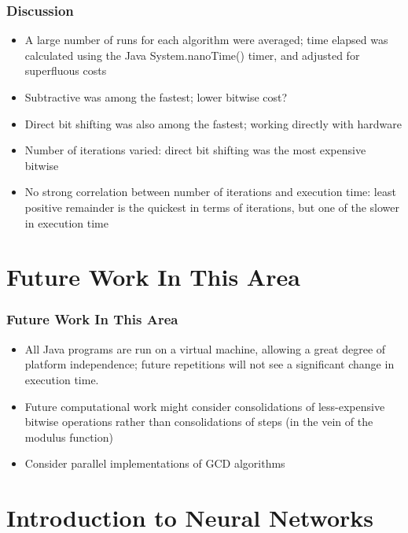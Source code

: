 \documentclass{beamer}
\begin{document}
\begin{frame}
\frametitle{Discussion}
\begin{itemize}
\item A large number of runs for each algorithm were averaged; time elapsed was calculated using the Java System.nanoTime() timer, and adjusted for superfluous costs 
\item Subtractive was among the fastest; lower bitwise cost?
\item Direct bit shifting was also among the fastest; working directly with hardware
\item Number of iterations varied: direct bit shifting was the most expensive bitwise
\item No strong correlation between number of iterations and execution time: least positive remainder is the quickest in terms of iterations, but one of the slower in execution time
\end{itemize}
\end{frame}

\section{Future Work In This Area}
\begin{frame}
\frametitle{Future Work In This Area}
\begin{itemize}
\item All Java programs are run on a virtual machine, allowing a great degree of platform independence; future repetitions will not see a significant change in execution time.
\item Future computational work might consider consolidations of less-expensive bitwise operations rather than consolidations of steps (in the vein of the modulus function)
\item Consider parallel implementations of GCD algorithms
\end{itemize}
\end{frame}



\section{Introduction to Neural Networks}
\end{document}
